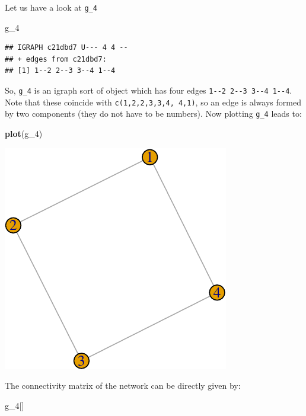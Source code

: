 \documentclass[]{article}
\newenvironment{Shaded}{\begin{snugshade}}{\end{snugshade}}
\newcommand{\KeywordTok}[1]{\textcolor[rgb]{0.13,0.29,0.53}{\textbf{#1}}}
\newcommand{\DecValTok}[1]{\textcolor[rgb]{0.00,0.00,0.81}{#1}}
\newcommand{\NormalTok}[1]{#1}
\theoremstyle{definition}
\theoremstyle{definition}
\theoremstyle{definition}
\theoremstyle{remark}
\begin{document}
Let us have a look at \texttt{g\_4}

\begin{Shaded}
\begin{Highlighting}[]
\NormalTok{g_}\DecValTok{4}
\end{Highlighting}
\end{Shaded}

\begin{verbatim}
## IGRAPH c21dbd7 U--- 4 4 -- 
## + edges from c21dbd7:
## [1] 1--2 2--3 3--4 1--4
\end{verbatim}

So, \texttt{g\_4} is an igraph sort of object which has four edges
\texttt{1-\/-2\ 2-\/-3\ 3-\/-4\ 1-\/-4}. Note that these coincide with
\texttt{c(1,2,2,3,3,4,\ 4,1)}, so an edge is always formed by two
components (they do not have to be numbers). Now plotting \texttt{g\_4}
leads to:

\begin{Shaded}
\begin{Highlighting}[]
\KeywordTok{plot}\NormalTok{(g_}\DecValTok{4}\NormalTok{)}
\end{Highlighting}
\end{Shaded}

\includegraphics{ResearchTools_files/figure-latex/unnamed-chunk-43-1.pdf}

The connectivity matrix of the network can be directly given by:

\begin{Shaded}
\begin{Highlighting}[]
\NormalTok{g_}\DecValTok{4}\NormalTok{[]}
\end{Highlighting}
\end{Shaded}
\end{document}
